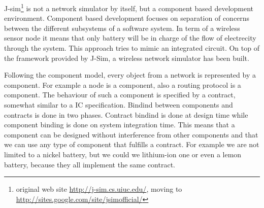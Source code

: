 \label{subsec:jsim}
J-sim\footnote {original web site \url{http://j-sim.cs.uiuc.edu/}, moving to 
\url{http://sites.google.com/site/jsimofficial/}} is not a network simulator
by itself, but a component based development environment. Component based
development focuses on separation of concerns between the different subsystems
of a software system. In term of a wireless sensor node it means that only 
battery will be in charge of the flow of electrecity through the system.
This approach tries to mimic an integrated circuit. On top of the framework 
provided by J-Sim, a wireless network simulator has been built.

Following the component model, every object from a network is represented
by a component. For example a node is a component, also a routing protocol
is a component. The behaviour of such a component is specified by a contract,
somewhat similar to a IC specification. Bindind between components and contracts
is done in two phases. Contract bindind is done at design time while component
binding is done on system integration time. This means that a component can be
designed without interference from other components and that we can use any type
of component that fulfills a contract. For example we are not limited to a nickel
battery, but we could we lithium-ion one or even a lemon battery, because they all
implement the same contract.

